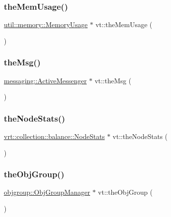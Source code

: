 \mbox{\label{namespacevt_a38d485d3cf840b9a623e47e7754ef72e}} 
\subsubsection{\texorpdfstring{the\+Mem\+Usage()}{theMemUsage()}}
{\footnotesize\ttfamily \hyperlink{structvt_1_1util_1_1memory_1_1_memory_usage}{util\+::memory\+::\+Memory\+Usage} $\ast$ vt\+::the\+Mem\+Usage (\begin{DoxyParamCaption}{ }\end{DoxyParamCaption})}

\mbox{\label{namespacevt_aeafd31f866aeb4dc6fc2f6ee97136350}} 
\subsubsection{\texorpdfstring{the\+Msg()}{theMsg()}}
{\footnotesize\ttfamily \hyperlink{structvt_1_1messaging_1_1_active_messenger}{messaging\+::\+Active\+Messenger} $\ast$ vt\+::the\+Msg (\begin{DoxyParamCaption}{ }\end{DoxyParamCaption})}

\mbox{\label{namespacevt_ae1526efa346612ad330d9a628e596c54}} 
\subsubsection{\texorpdfstring{the\+Node\+Stats()}{theNodeStats()}}
{\footnotesize\ttfamily \hyperlink{structvt_1_1vrt_1_1collection_1_1balance_1_1_node_stats}{vrt\+::collection\+::balance\+::\+Node\+Stats} $\ast$ vt\+::the\+Node\+Stats (\begin{DoxyParamCaption}{ }\end{DoxyParamCaption})}

\mbox{\label{namespacevt_a833f0115b692f578167cbd88e30d39c5}} 
\subsubsection{\texorpdfstring{the\+Obj\+Group()}{theObjGroup()}}
{\footnotesize\ttfamily \hyperlink{structvt_1_1objgroup_1_1_obj_group_manager}{objgroup\+::\+Obj\+Group\+Manager} $\ast$ vt\+::the\+Obj\+Group (\begin{DoxyParamCaption}{ }\end{DoxyParamCaption})}

